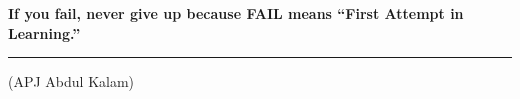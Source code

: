 \vspace*{\fill} %
\begin{center}
    \Huge
    \textbf{If you fail, never give up because FAIL means ``First Attempt in Learning.''}
    
    \vspace{0.5cm}
    \hrule %
    \vspace{0.5cm}
    \large
    (APJ Abdul Kalam)
\end{center}
\vspace*{\fill} %